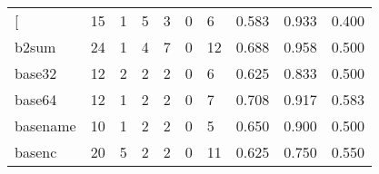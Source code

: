 \begin{longtable}{lp{2.0cm}p{2.0cm}p{2.0cm}p{2.0cm}p{2.0cm}p{2.0cm}p{2.0cm}p{2.0cm}p{2.0cm}}
\bottomrule
\endlastfoot
{[}         &                     15 &                                             1 &                                            5 &                                           3 &                                            0 &                                          6 &                                0.583 &                                  0.933 &                                0.400 \\
b2sum     &                     24 &                                             1 &                                            4 &                                           7 &                                            0 &                                         12 &                                0.688 &                                  0.958 &                                0.500 \\
base32    &                     12 &                                             2 &                                            2 &                                           2 &                                            0 &                                          6 &                                0.625 &                                  0.833 &                                0.500 \\
base64    &                     12 &                                             1 &                                            2 &                                           2 &                                            0 &                                          7 &                                0.708 &                                  0.917 &                                0.583 \\
basename  &                     10 &                                             1 &                                            2 &                                           2 &                                            0 &                                          5 &                                0.650 &                                  0.900 &                                0.500 \\
basenc    &                     20 &                                             5 &                                            2 &                                           2 &                                            0 &                                         11 &                                0.625 &                                  0.750 &                                0.550 \\

\end{longtable}
